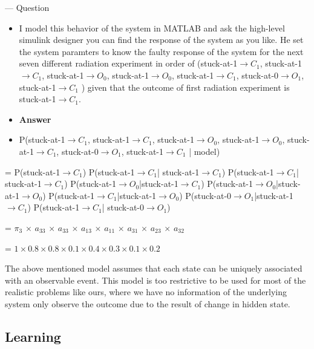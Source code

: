 --- Question

\begin{itemize}
\item I model this behavior of the system in MATLAB and ask the high-level simulink designer you can find the response of the system as you like. He set the system paramters to know the faulty response of the system for the next seven different radiation experiment in order of (stuck-at-1$\rightarrow C_{1}$, stuck-at-1$\rightarrow C_{1}$, stuck-at-1$\rightarrow O_{0}$, stuck-at-1$\rightarrow O_{0}$, stuck-at-1$\rightarrow C_{1}$, stuck-at-0$\rightarrow O_{1}$, stuck-at-1$\rightarrow C_{1}$  ) given that the outcome of first radiation experiment is stuck-at-1$\rightarrow C_{1}$.

\item \textbf{Answer}


\item P(stuck-at-1$\rightarrow C_{1}$, stuck-at-1$\rightarrow C_{1}$, stuck-at-1$\rightarrow O_{0}$, stuck-at-1$\rightarrow O_{0}$, stuck-at-1$\rightarrow C_{1}$, stuck-at-0$\rightarrow O_{1}$, stuck-at-1$\rightarrow C_{1}$ | model)
\end{itemize}

\hspace{0.2cm} = P(stuck-at-1$\rightarrow C_{1}$) P(stuck-at-1$\rightarrow C_{1}$| stuck-at-1$\rightarrow C_{1}$) P(stuck-at-1$\rightarrow C_{1}$| stuck-at-1$\rightarrow C_{1}$) P(stuck-at-1$\rightarrow O_{0}$|stuck-at-1$\rightarrow C_{1}$) P(stuck-at-1$\rightarrow O_{0}$|stuck-at-1$\rightarrow O_{0}$) P(stuck-at-1$\rightarrow C_{1}$|stuck-at-1$\rightarrow O_{0}$) P(stuck-at-0$\rightarrow O_{1}$|stuck-at-1$\rightarrow C_{1}$) P(stuck-at-1$\rightarrow C_{1}$| stuck-at-0$\rightarrow O_{1}$)

\hspace{0.2cm} = $\pi_3$ $\times$ $a_33$ $\times$ $a_33$ $\times$ $a_13$ $\times$ $a_11$ $\times$ $a_31$ $\times$ $a_23$ $\times$ $a_32$

\hspace{0.2cm} = $1 \times 0.8 \times 0.8 \times 0.1 \times 0.4 \times 0.3 \times 0.1 \times 0.2$

The above mentioned model assumes that each state can be uniquely associated with an observable event. This model is too restrictive to be used for most of the realistic problems like ours, where we have no information of the underlying system only observe the outcome due to the result of change in hidden state.


\subsection{Learning}


